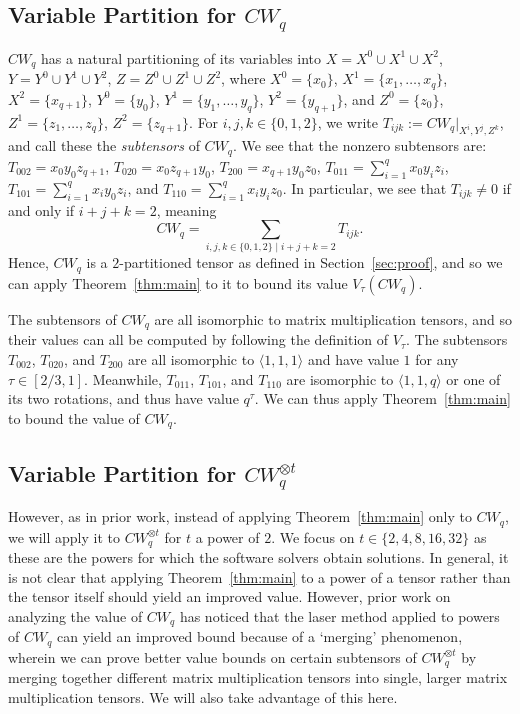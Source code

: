 \documentclass{theoretics}
\begin{document}
\subsection{Variable Partition for \texorpdfstring{$CW_q$}{CWq}}

$CW_q$ has a natural partitioning of its variables into $X=X^0\cup X^1\cup X^2$, $Y=Y^0\cup Y^1\cup Y^2$, $Z=Z^0\cup Z^1\cup Z^2$, where $X^0=\{x_0\}$, $X^1=\{x_1,\ldots,x_q\}$, $X^2=\{x_{q+1}\}$, $Y^0=\{y_0\}$, $Y^1=\{y_1,\ldots,y_q\}$, $Y^2=\{y_{q+1}\}$, and $Z^0=\{z_0\}$, $Z^1=\{z_1,\ldots,z_q\}$, $Z^2=\{z_{q+1}\}$. 
For $i,j,k \in \{0,1,2\}$, we write $T_{ijk} := CW_q|_{X^i,Y^j,Z^k}$, and call these the \emph{subtensors} of $CW_q$. We see that the nonzero subtensors are: $T_{002}=x_0 y_0 z_{q+1}$, $T_{020}= x_0 z_{q+1} y_0$,  $T_{200}=x_{q+1} y_0 z_0$, $T_{011}=\sum_{i=1}^q x_0 y_i z_i$,  $T_{101}=\sum_{i=1}^q x_i y_0 z_i$, and $T_{110}=\sum_{i=1}^q x_i y_i z_0$. In particular, we see that $T_{ijk} \neq 0$ if and only if $i+j+k=2$, meaning
$$CW_q=\sum_{i,j,k\in \{0,1,2\} \mid i+j+k=2} T_{ijk}.$$
Hence, $CW_q$ is a $2$-partitioned tensor as defined in Section~\ref{sec:proof}, and so we can apply Theorem~\ref{thm:main} to it to bound its value $V_\tau(CW_q)$.

The subtensors of $CW_q$ are all isomorphic to matrix multiplication tensors, and so their values can all be computed by following the definition of $V_\tau$. The subtensors
$T_{002}$, $T_{020}$, and $T_{200}$ are all isomorphic to $\langle 1,1,1\rangle$ and have value $1$ for any $\tau \in [2/3,1]$. Meanwhile, $T_{011}$, $T_{101}$, and $T_{110}$ are isomorphic to $\langle 1,1,q\rangle$ or one of its two rotations, and thus have value $q^\tau$. We can thus apply Theorem~\ref{thm:main} to bound the value of $CW_q$. 


\subsection{Variable Partition for \texorpdfstring{$CW_q^{\otimes t}$}{CWqot}}

However, as in prior work, instead of applying Theorem~\ref{thm:main} only to $CW_q$, we will apply it to $CW_q^{\otimes t}$ for $t$ a power of $2$. We focus on $t \in \{2,4,8,16,32\}$ as these are the powers for which the software solvers obtain solutions. In general, it is not clear that applying Theorem~\ref{thm:main} to a power of a tensor rather than the tensor itself should yield an improved value. However, prior work on analyzing the value of $CW_q$ has noticed that the laser method applied to powers of $CW_q$ can yield an improved bound because of a `merging' phenomenon, wherein we can prove better value bounds on certain subtensors of $CW_q^{\otimes t}$ by merging together different matrix multiplication tensors into single, larger matrix multiplication tensors. We will also take advantage of this here. 
\end{document}
